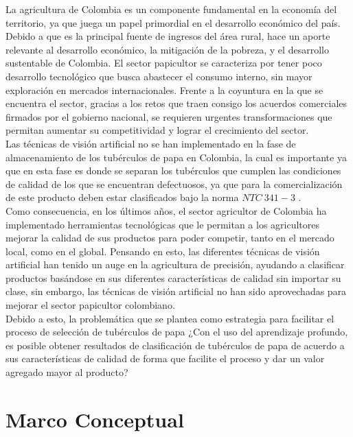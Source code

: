 La agricultura de Colombia es un componente fundamental en la economía del territorio, ya que juega un papel primordial en el desarrollo económico del país. Debido a que es la principal fuente de ingresos del área rural, hace un aporte relevante al desarrollo económico, la mitigación de la pobreza, y el desarrollo sustentable de Colombia. El sector papicultor se caracteriza por tener poco desarrollo tecnológico que busca abastecer el consumo interno, sin mayor exploración en mercados internacionales. Frente a la coyuntura en la que se encuentra el sector, gracias a los retos que traen consigo los acuerdos comerciales firmados por el gobierno nacional, se requieren urgentes transformaciones que permitan aumentar su competitividad y lograr el crecimiento del sector.\\

Las técnicas de visión artificial no se han implementado en la fase de almacenamiento de los tubérculos de papa en Colombia, la cual es importante ya que en esta fase es donde se separan los tubérculos que cumplen las condiciones de calidad de los que se encuentran defectuosos, ya que para la comercialización de este producto deben estar clasificados bajo la norma $NTC \ 341-3$ \cite{ntc341}. \\

Como consecuencia, en los últimos años, el sector agricultor de Colombia ha implementado herramientas tecnológicas que le permitan a los agricultores mejorar la calidad de sus productos para poder competir, tanto en el mercado local, como en el global. Pensando en esto, las diferentes técnicas de visión artificial han tenido un auge en la agricultura de precisión, ayudando a clasificar productos basándose en sus diferentes características de calidad sin importar su clase, sin embargo, las técnicas de visión artificial no han sido aprovechadas para mejorar el sector papicultor colombiano. \\


Debido a esto, la problemática que se plantea como estrategia para facilitar el proceso de selección de tubérculos de papa ¿Con el uso del aprendizaje profundo, es posible obtener resultados de clasificación de tubérculos de papa de acuerdo a sus características de calidad de forma que facilite el proceso y dar un valor agregado mayor al producto?\\


\chapter{Marco Conceptual}

